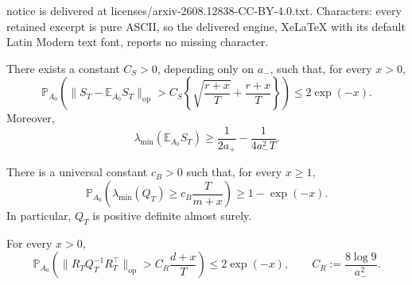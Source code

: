 \documentclass[10pt,a4paper]{amsart}
\begin{document}
notice is delivered at licenses/arxiv-2608.12838-CC-BY-4.0.txt. Characters: every retained excerpt is pure ASCII, so the delivered engine, XeLaTeX with its default Latin Modern text font, reports no missing character.
\begin{lemma}%
\label{lem:exact-low-rank-stable-block}
There exists a constant $C_S>0$, depending only on $a_-$, such that, for every
$x>0$,
\begin{equation}
    \mathbb P_{A_0}\!\left(
        \|S_T-\mathbb E_{A_0}S_T\|_{\mathrm{op}}
        >C_S\left\{
            \sqrt{\frac{r+x}{T}}+\frac{r+x}{T}
        \right\}
    \right)
    \leq2\exp(-x).
\label{eq:exact-low-rank-stable-concentration}
\end{equation}
Moreover,
\begin{equation}
    \lambda_{\min}\!\left(\mathbb E_{A_0}S_T\right)
    \geq
    \frac1{2a_+}-\frac1{4a_-^2T}.
\label{eq:exact-low-rank-stable-mean-lower}
\end{equation}
\end{lemma}

\begin{lemma}%
\label{lem:exact-low-rank-brownian-block}
There is a universal constant $c_B>0$ such that, for every $x\geq1$,
\begin{equation}
    \mathbb P_{A_0}\!\left(
        \lambda_{\min}(Q_T)
        \geq c_B\frac{T}{m+x}
    \right)
    \geq1-\exp(-x).
\label{eq:exact-low-rank-brownian-lower}
\end{equation}
In particular, $Q_T$ is positive definite almost surely.
\end{lemma}

\begin{lemma}%
\label{lem:exact-low-rank-cross-block}
For every $x>0$,
\begin{equation}
    \mathbb P_{A_0}\!\left(
        \|R_TQ_T^{-1}R_T^\top\|_{\mathrm{op}}
        >C_R\frac{d+x}{T}
    \right)
    \leq2\exp(-x),
    \qquad
    C_R:=\frac{8\log9}{a_-^2}.
\label{eq:exact-low-rank-cross-bound}
\end{equation}
\end{lemma}
\end{document}
